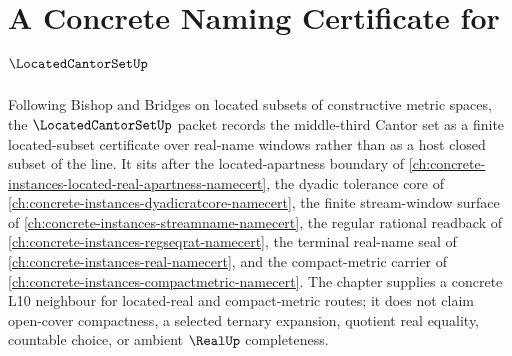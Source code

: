 \chapter{A Concrete Naming Certificate for $\LocatedCantorSetUp$}
\label{ch:concrete-instances-located-cantor-set-namecert}

Following Bishop and Bridges on located subsets of constructive metric spaces, the $\LocatedCantorSetUp$ packet records the middle-third Cantor set as a finite located-subset certificate over real-name windows rather than as a host closed subset of the line. It sits after the located-apartness boundary of \autoref{ch:concrete-instances-located-real-apartness-namecert}, the dyadic tolerance core of \autoref{ch:concrete-instances-dyadicratcore-namecert}, the finite stream-window surface of \autoref{ch:concrete-instances-streamname-namecert}, the regular rational readback of \autoref{ch:concrete-instances-regseqrat-namecert}, the terminal real-name seal of \autoref{ch:concrete-instances-real-namecert}, and the compact-metric carrier of \autoref{ch:concrete-instances-compactmetric-namecert}. The chapter supplies a concrete L10 neighbour for located-real and compact-metric routes; it does not claim open-cover compactness, a selected ternary expansion, quotient real equality, countable choice, or ambient $\RealUp$ completeness.

